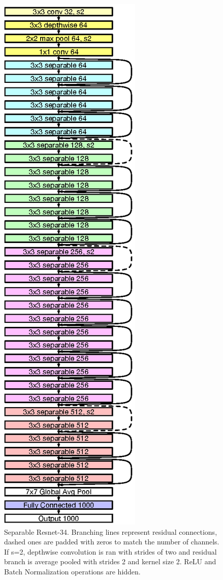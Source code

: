 \begin{figure}
\vspace{-65px}
  \begin{center}
        \includegraphics{images/separable_resnet.eps}
  \end{center}
  \caption{Separable Resnet-34. Branching lines represent residual connections, dashed ones are padded with zeros to match the number of channels. If s=2, depthwise convolution is ran with strides of two and residual branch is average pooled with strides 2 and kernel size 2. ReLU and Batch Normalization operations are hidden.}
  \label{fig:model}
\end{figure}
